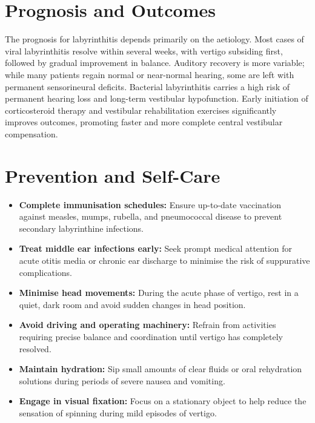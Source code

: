 \section*{Prognosis and Outcomes}
The prognosis for labyrinthitis depends primarily on the aetiology. Most cases of viral labyrinthitis resolve within several weeks, with vertigo subsiding first, followed by gradual improvement in balance. Auditory recovery is more variable; while many patients regain normal or near-normal hearing, some are left with permanent sensorineural deficits. Bacterial labyrinthitis carries a high risk of permanent hearing loss and long-term vestibular hypofunction. Early initiation of corticosteroid therapy and vestibular rehabilitation exercises significantly improves outcomes, promoting faster and more complete central vestibular compensation.

\section*{Prevention and Self-Care}
\begin{itemize}
    \item \textbf{Complete immunisation schedules:} Ensure up-to-date vaccination against measles, mumps, rubella, and pneumococcal disease to prevent secondary labyrinthine infections.
    \item \textbf{Treat middle ear infections early:} Seek prompt medical attention for acute otitis media or chronic ear discharge to minimise the risk of suppurative complications.
    \item \textbf{Minimise head movements:} During the acute phase of vertigo, rest in a quiet, dark room and avoid sudden changes in head position.
    \item \textbf{Avoid driving and operating machinery:} Refrain from activities requiring precise balance and coordination until vertigo has completely resolved.
    \item \textbf{Maintain hydration:} Sip small amounts of clear fluids or oral rehydration solutions during periods of severe nausea and vomiting.
    \item \textbf{Engage in visual fixation:} Focus on a stationary object to help reduce the sensation of spinning during mild episodes of vertigo.
\end{itemize}

